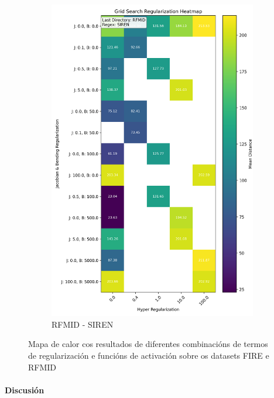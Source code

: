 \begin{figure}[ht]
\begin{subfigure}[b]{0.45\textwidth}
        \includegraphics[width=\textwidth]{imaxes/grid_search_single_heatmap_RFMID_SIREN.png}
        \caption{RFMID - SIREN}
        \label{fig:gs_single_RFMID_SIREN}
    \end{subfigure}
    
    \caption{Mapa de calor cos resultados de diferentes combinacións de termos de regularización e funcións de activación sobre os datasets FIRE e RFMID}
    \label{fig:gs_single_heatmaps}
\end{figure}

\paragraph{Discusión}
\label{par:Discusion-regularization}

